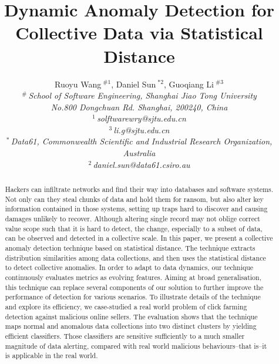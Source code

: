 \documentclass[10pt,conference,letterpaper]{IEEEtran}
\title{Dynamic Anomaly Detection for Collective Data via Statistical Distance}
\author{%
	{Ruoyu Wang{\small $~^{\#1}$}, Daniel Sun{\small $~^{*2}$}, Guoqiang Li{\small $~^{\#3}$} }%
	\vspace{1.6mm}\\
	\fontsize{10}{10}\selectfont\itshape
	$^{\#}$\,School of Software Engineering, Shanghai Jiao Tong University\\
	No.800 Dongchuan Rd. Shanghai, 200240, China\\
	\fontsize{9}{9}\selectfont\ttfamily\upshape
	$^{1}$\,solftwarewry@sjtu.edu.cn\\
	$^{3}$\,li.g@sjtu.edu.cn%
	\vspace{1.2mm}\\
	\fontsize{10}{10}\selectfont\rmfamily\itshape
	$^{*}$\,Data61, Commonwealth Scientific and Industrial Research Organization, Australia\\
	\fontsize{9}{9}\selectfont\ttfamily\upshape
	$^{2}$\,daniel.sun@data61.csiro.au
}
\begin{document}
\maketitle
%
	\begin{abstract} 
		Hackers can infiltrate networks and find their way into databases and software systems. Not only
		can they steal chunks of data and hold them for ransom, but
		also alter key information contained in those systems, setting up
		traps hard to discover and causing damages unlikely to recover.
		Although altering single record may not oblige correct value scope such that it is hard to detect, the change, especially to a subset of data, can be observed and detected in a collective
		scale. In this paper, we present a collective anomaly
		detection technique based on statistical distance. The technique
		extracts distribution similarities among data collections, and then uses the statistical distance to detect
		collective anomalies. In order to adapt to data dynamics, our technique continuously evaluates 
		metrics as evolving features. Aiming at broad generalisation, this
		technique can replace several components of our solution to further improve the
		performance of detection for various scenarios. To illustrate details of the technique
		and explore its efficiency, we case-studied a real
		world problem of click farming detection against malicious online
		sellers. The evaluation shows that the technique maps normal
		and anomalous data collections into two distinct clusters by yielding
		efficient classifiers. Those classifiers are sensitive sufficiently to
		a much smaller magnitude of data alerting, compared with real
		world malicious behaviours--that is--it is applicable in the real world. 
	\end{abstract}

%
\end{document}
